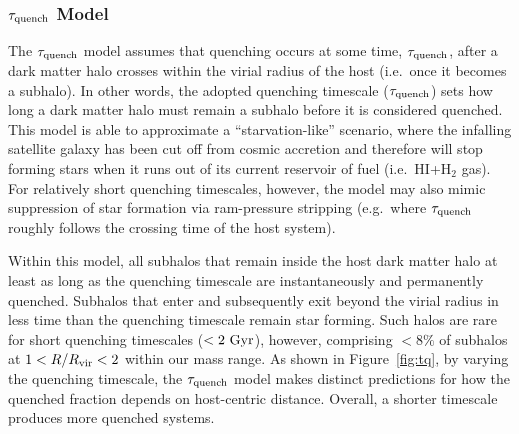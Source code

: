 \subsubsection{$\tau_{\rm quench}$ Model}
\label{subsubsec:starve}

The $\tau_{\rm quench}$ model assumes that quenching occurs at some time,
$\tau_{\rm quench}$, after a dark matter halo crosses within the virial radius of
the host (i.e.~once it becomes a subhalo).
%
In other words, the adopted quenching timescale ($\tau_{\rm quench}$) sets how
long a dark matter halo must remain a subhalo before it is considered quenched.
% 
This model is able to approximate a ``starvation-like'' scenario,
where the infalling satellite galaxy has been cut off from cosmic
accretion and therefore will stop forming stars when it runs out of
its current reservoir of fuel (i.e.~H{\scriptsize I}+H$_{2}$ gas). 
%
For relatively short quenching timescales, however, the model may also
mimic suppression of star formation via ram-pressure stripping
(e.g.~where $\tau_{\rm quench}$ roughly follows the crossing time of
the host system). 





Within this model, all subhalos that remain inside the host dark matter halo at
least as long as the quenching timescale are instantaneously and permanently
quenched.
%
Subhalos that enter and subsequently exit beyond the virial radius in less time
than the quenching timescale remain star forming.
%
Such halos are rare for short quenching timescales ($<2~{\rm Gyr}$),
however, comprising $<8\%$ of subhalos at $1<R/R_{\rm{vir}}<2$ within our
mass range. 
%
As shown in Figure~\ref{fig:tq}, by varying the quenching timescale, the
$\tau_{\rm quench}$ model makes distinct predictions for how the
quenched fraction depends on host-centric distance. Overall, a shorter
timescale produces more quenched systems.





